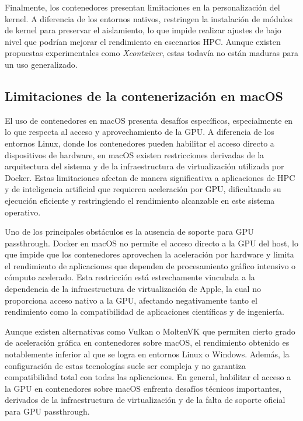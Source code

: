 Finalmente, los contenedores presentan limitaciones en la personalización del kernel. A diferencia de los entornos nativos, restringen la instalación de módulos de kernel para preservar el aislamiento, lo que impide realizar ajustes de bajo nivel que podrían mejorar el rendimiento en escenarios \acs{HPC}. Aunque existen propuestas experimentales como \textit{Xcontainer}, estas todavía no están maduras para un uso generalizado.

\subsection{Limitaciones de la contenerización en macOS}

El uso de contenedores en macOS presenta desafíos específicos, especialmente en lo que respecta al acceso y aprovechamiento de la GPU. A diferencia de los entornos Linux, donde los contenedores pueden habilitar el acceso directo a dispositivos de hardware, en macOS existen restricciones derivadas de la arquitectura del sistema y de la infraestructura de virtualización utilizada por Docker. Estas limitaciones afectan de manera significativa a aplicaciones de \acs{HPC} y de inteligencia artificial que requieren aceleración por GPU, dificultando su ejecución eficiente y restringiendo el rendimiento alcanzable en este sistema operativo.

Uno de los principales obstáculos es la ausencia de soporte para GPU passthrough. Docker en macOS no permite el acceso directo a la GPU del host, lo que impide que los contenedores aprovechen la aceleración por hardware y limita el rendimiento de aplicaciones que dependen de procesamiento gráfico intensivo o cómputo acelerado. Esta restricción está estrechamente vinculada a la dependencia de la infraestructura de virtualización de Apple, la cual no proporciona acceso nativo a la GPU, afectando negativamente tanto el rendimiento como la compatibilidad de aplicaciones científicas y de ingeniería.

Aunque existen alternativas como Vulkan o MoltenVK que permiten cierto grado de aceleración gráfica en contenedores sobre macOS, el rendimiento obtenido es notablemente inferior al que se logra en entornos Linux o Windows. Además, la configuración de estas tecnologías suele ser compleja y no garantiza compatibilidad total con todas las aplicaciones. En general, habilitar el acceso a la GPU en contenedores sobre macOS enfrenta desafíos técnicos importantes, derivados de la infraestructura de virtualización y de la falta de soporte oficial para GPU passthrough.


